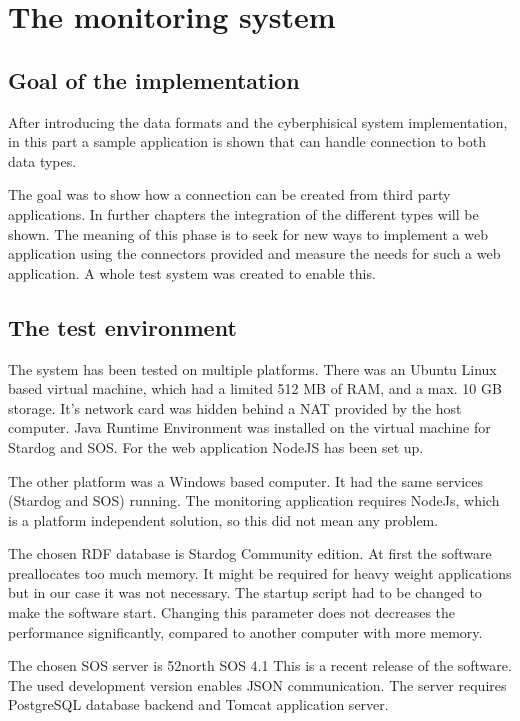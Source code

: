 \chapter{The monitoring system}
\section{Goal of the implementation}

After introducing the data formats and the cyberphisical system implementation, in this part a sample application is shown that can handle connection to both data types.

The goal was to show how a connection can be created from third party applications. In further chapters the integration of the different types will be shown. The meaning of this phase is to seek for new ways to implement a web application using the connectors provided and measure the needs for such a web application. A whole test system was created to enable this.

\section{The test environment}

The system has been tested on multiple platforms. There was an Ubuntu Linux based virtual machine, which had a limited 512 MB of RAM, and a max. 10 GB storage. It's network card was hidden behind a NAT provided by the host computer. Java Runtime Environment was installed on the virtual machine for Stardog and SOS. For the web application NodeJS has been set up. 

The other platform was a Windows based computer. It had the same services (Stardog and SOS) running. The monitoring application requires NodeJs, which is a platform independent solution, so this did not mean any problem.

The chosen RDF database is Stardog Community edition. At first the software preallocates too much memory. It might be required for heavy weight applications but in our case it was not necessary.  The startup script had to be changed to make the software start. Changing this parameter does not decreases the performance significantly, compared to another computer with more memory. 

The chosen SOS server is 52north SOS 4.1 This is a recent release of the software. The used development version enables JSON communication. The server requires PostgreSQL database backend and Tomcat application server.

